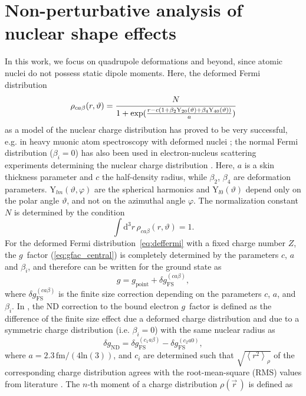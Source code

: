 \section{Non-perturbative analysis of nuclear shape effects}
In this work, we focus on quadrupole deformations and beyond, since atomic nuclei do not possess static dipole moments. Here, the deformed Fermi distribution
\begin{equation}
\rho_{ca\beta}(r,\vartheta)=\cfrac{N}{1+\text{exp}(\frac{r-c(1+\beta_2 \text{Y}_{20}(\vartheta)+\beta_4 \text{Y}_{40}(\vartheta))}{a})}
\label{eq:deffermi}
\end{equation}
as a model of the nuclear charge distribution has proved to be very successful, e.g. in heavy muonic atom spectroscopy with deformed nuclei \cite{hitlin1970,tanaka1984}; the normal Fermi distribution (${\beta_i}{=}{0}$) has also been used in electron-nucleus scattering experiments determining the nuclear charge distribution \cite{hahn1956}. Here, $a$ is a skin thickness parameter and $c$ the half-density radius, while $\beta_2$, $\beta_4$ are deformation parameters. $\text{Y}_{lm}(\vartheta,\varphi)$ are the spherical harmonics and $\text{Y}_{l0}(\vartheta)$ depend only on the polar angle $\vartheta$, and not on the azimuthal angle $\varphi$. The normalization constant $N$ is determined by the condition
\begin{equation}
\int \text{d}^3r\, \rho_{ca\beta}(r,\vartheta)=1.
\end{equation}%
For the deformed Fermi distribution~\eqref{eq:deffermi} with a fixed charge number $Z$, the $g$~factor (\ref{eq:gfac_central}) is completely determined by the parameters $c$, $a$ and $\beta_i$, and therefore can be written for the ground state as
\begin{equation}
g = g_{\text{point}} + \delta g^{(ca\beta)}_{\text{FS}},
\label{eq:finiteDef}
\end{equation}
where $\delta g^{(ca\beta)}_{\text{FS}}$ is the finite size correction depending on the parameters $c$, $a$, and $\beta_i$. In \cite{jacek2012}, the ND correction to the bound electron $g$~factor is defined as the difference of the finite size effect due a deformed charge distribution and due to a symmetric charge distribution (i.e. ${\beta_i}{=}{0}$) with the same nuclear radius as
\begin{equation}
\delta g_{\text{ND}}=\delta g^{(c_1a\beta)}_{\text{FS}} - \delta g^{(c_2a0)}_{\text{FS}},
\label{eq:defdgnd}
\end{equation}
where $a=2.3\,\text{fm}/(4\text{ln}(3))$, and $c_i$ are determined such that $\sqrt{\left<r^2\right>_{\rho}}$ of the corresponding charge distribution agrees with the root-mean-square (RMS) values from literature \cite{Angeli2013}. The $n$-th moment of a charge distribution $\rho(\vec{r}\,)$ is defined as
